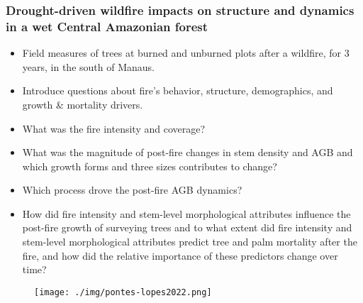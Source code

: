 \documentclass{beamer}
\begin{document}
\begin{frame}[t, allowframebreaks]
    \frametitle{Drought-driven wildfire impacts on structure and dynamics in a 
    wet Central Amazonian forest~\cite{pontes-lopes2021}}
    \begin{itemize}
        \item Field measures of trees at burned and unburned plots after a 
            wildfire, for 3 years, in the south of Manaus.
        \item Introduce questions about fire's behavior, structure, 
            demographics, and growth \& mortality drivers.
        \item What was the fire intensity and coverage?
        \item What was the magnitude of post-fire changes in stem density and 
            AGB and which growth forms and three sizes contributes to change?
        \item Which process drove the post-fire AGB dynamics?
        \item How did fire intensity and stem-level morphological attributes
            influence the post-fire growth of surveying trees and to what extent 
            did fire intensity and stem-level morphological attributes predict 
            tree and palm mortality after the fire, and how did the relative 
            importance of these predictors change over time?
    \end{itemize}
    \begin{figure}
        \centering
        \texttt{[image: ./img/pontes-lopes2022.png]}
    \end{figure}
\end{frame}
\end{document}
